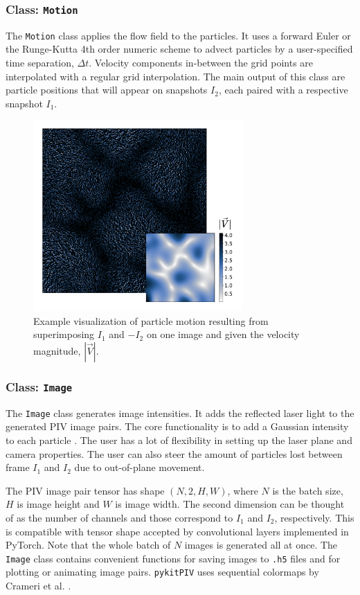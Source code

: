 \documentclass[a4paper,fleqn]{cas-dc}
\begin{document}
\subsubsection{Class: \texttt{Motion}} \label{sec:class-Motion}

The \texttt{Motion} class applies the flow field to the particles. It uses a forward Euler or the Runge-Kutta 4th order numeric scheme to advect particles by a user-specified time separation, $\Delta t$. Velocity components in-between the grid points are interpolated with a regular grid interpolation. The main output of this class are particle positions that will appear on snapshots $I_2$, each paired with a respective snapshot $I_1$.

\begin{figure}[t]
\centering
\includegraphics[width=8cm]{motion-image.pdf}
\caption{Example visualization of particle motion resulting from superimposing $I_1$ and $-I_2$ on one image and given the velocity magnitude, $|\vec{V}|$.}
\label{fig:particle-motion}
\end{figure}

\subsubsection{Class: \texttt{Image}} \label{sec:class-Image}

The \texttt{Image} class generates image intensities. It adds the reflected laser light to the generated PIV image pairs. The core functionality is to add a Gaussian intensity to each particle \citep{olsen2000out, rabault2017performing}. The user has a lot of flexibility in setting up the laser plane and camera properties. The user can also steer the amount of particles lost between frame $I_1$ and $I_2$ due to out-of-plane movement.

The PIV image pair tensor has shape $(N, 2, H, W)$, where $N$ is the batch size, $H$ is image height and $W$ is image width. The second dimension can be thought of as the number of channels and those correspond to $I_1$ and $I_2$, respectively. This is compatible with tensor shape accepted by convolutional layers implemented in PyTorch. Note that the whole batch of $N$ images is generated all at once. The \texttt{Image} class contains convenient functions for saving images to \texttt{.h5} files and for plotting or animating image pairs. \texttt{pykitPIV} uses sequential colormaps by Crameri et al. \cite{crameri2020misuse}.
\end{document}
